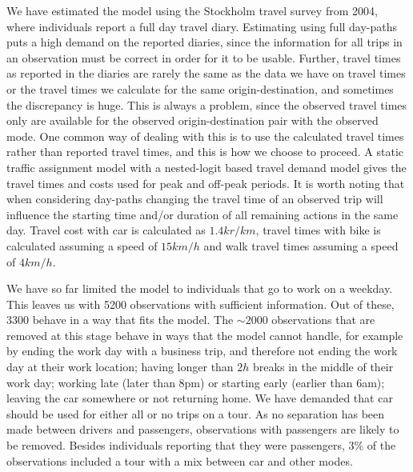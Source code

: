 
We have estimated the model using the Stockholm travel survey from 2004, where individuals report a full day travel diary. Estimating using full day-paths puts a high demand on the reported diaries, since the information for all trips in an observation must be correct in order for it to be usable. Further, travel times as reported in the diaries are rarely the same as the data we have on travel times or the travel times we calculate for the same origin-destination, and sometimes the discrepancy is huge. This is always a problem, since the observed travel times only are available for the observed origin-destination pair with the observed mode. One common way of dealing with this is to use the calculated travel times rather than reported travel times, and this is how we choose to proceed. A static traffic assignment model with a nested-logit based travel demand model gives the travel times and costs used for peak and off-peak periods. It is worth noting that when considering day-paths changing the travel time of an observed trip will influence the starting time and/or duration of all remaining actions in the same day. Travel cost with car is calculated as $1.4\unit{kr/km}$, travel times with bike is calculated assuming a speed of $15\unit{km/h}$ and walk travel times assuming a speed of $4\unit{km/h}$.

We have so far limited the model to individuals that go to work on a weekday. This leaves us with 5200 observations with sufficient information. Out of these, 3300 behave in a way that fits the model. The $\sim 2000$ observations that are removed at this stage behave in ways that the model cannot handle, for example by ending the work day with a business trip, and therefore not ending the work day at their work location; having longer than $2h$ breaks in the middle of their work day; working late (later than 8pm) or starting early (earlier than 6am); leaving the car somewhere or not returning home.
We have demanded that car should be used for either all or no trips on a tour. As no separation has been made between drivers and passengers, observations with passengers are likely to be removed. Besides individuals reporting that they were passengers, $3\%$ of the observations included a tour with a mix between car and other modes.






